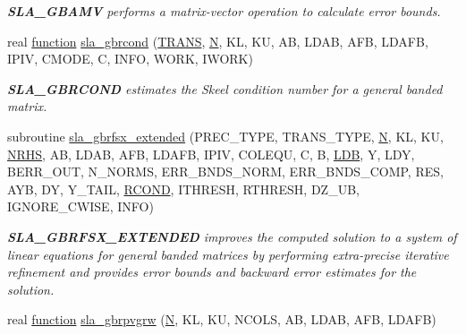 \begin{DoxyCompactItemize}
\begin{DoxyCompactList}\small\item\em {\bfseries S\+L\+A\+\_\+\+G\+B\+A\+M\+V} performs a matrix-\/vector operation to calculate error bounds. \end{DoxyCompactList}\item 
real \hyperlink{afunc_8m_a7b5e596df91eadea6c537c0825e894a7}{function} \hyperlink{group__realGBcomputational_ga1ff0196682b9e07d55a9267e236a9be5}{sla\+\_\+gbrcond} (\hyperlink{superlu__enum__consts_8h_a0c4e17b2d5cea33f9991ccc6a6678d62a1f61e3015bfe0f0c2c3fda4c5a0cdf58}{T\+R\+A\+N\+S}, \hyperlink{polmisc_8c_a0240ac851181b84ac374872dc5434ee4}{N}, K\+L, K\+U, A\+B, L\+D\+A\+B, A\+F\+B, L\+D\+A\+F\+B, I\+P\+I\+V, C\+M\+O\+D\+E, C, I\+N\+F\+O, W\+O\+R\+K, I\+W\+O\+R\+K)
\begin{DoxyCompactList}\small\item\em {\bfseries S\+L\+A\+\_\+\+G\+B\+R\+C\+O\+N\+D} estimates the Skeel condition number for a general banded matrix. \end{DoxyCompactList}\item 
subroutine \hyperlink{group__realGBcomputational_ga5ce5ba6e2efc6f91b09cb066ec7d0eed}{sla\+\_\+gbrfsx\+\_\+extended} (P\+R\+E\+C\+\_\+\+T\+Y\+P\+E, T\+R\+A\+N\+S\+\_\+\+T\+Y\+P\+E, \hyperlink{polmisc_8c_a0240ac851181b84ac374872dc5434ee4}{N}, K\+L, K\+U, \hyperlink{example__user_8c_aa0138da002ce2a90360df2f521eb3198}{N\+R\+H\+S}, A\+B, L\+D\+A\+B, A\+F\+B, L\+D\+A\+F\+B, I\+P\+I\+V, C\+O\+L\+E\+Q\+U, C, B, \hyperlink{example__user_8c_a50e90a7104df172b5a89a06c47fcca04}{L\+D\+B}, Y, L\+D\+Y, B\+E\+R\+R\+\_\+\+O\+U\+T, N\+\_\+\+N\+O\+R\+M\+S, E\+R\+R\+\_\+\+B\+N\+D\+S\+\_\+\+N\+O\+R\+M, E\+R\+R\+\_\+\+B\+N\+D\+S\+\_\+\+C\+O\+M\+P, R\+E\+S, A\+Y\+B, D\+Y, Y\+\_\+\+T\+A\+I\+L, \hyperlink{superlu__enum__consts_8h_af00a42ecad444bbda75cde1b64bd7e72a9b5c151728d8512307565994c89919d5}{R\+C\+O\+N\+D}, I\+T\+H\+R\+E\+S\+H, R\+T\+H\+R\+E\+S\+H, D\+Z\+\_\+\+U\+B, I\+G\+N\+O\+R\+E\+\_\+\+C\+W\+I\+S\+E, I\+N\+F\+O)
\begin{DoxyCompactList}\small\item\em {\bfseries S\+L\+A\+\_\+\+G\+B\+R\+F\+S\+X\+\_\+\+E\+X\+T\+E\+N\+D\+E\+D} improves the computed solution to a system of linear equations for general banded matrices by performing extra-\/precise iterative refinement and provides error bounds and backward error estimates for the solution. \end{DoxyCompactList}\item 
real \hyperlink{afunc_8m_a7b5e596df91eadea6c537c0825e894a7}{function} \hyperlink{group__realGBcomputational_gaebfb2731781fd1734b41bc3cc0222711}{sla\+\_\+gbrpvgrw} (\hyperlink{polmisc_8c_a0240ac851181b84ac374872dc5434ee4}{N}, K\+L, K\+U, N\+C\+O\+L\+S, A\+B, L\+D\+A\+B, A\+F\+B, L\+D\+A\+F\+B)

\end{DoxyCompactItemize}

